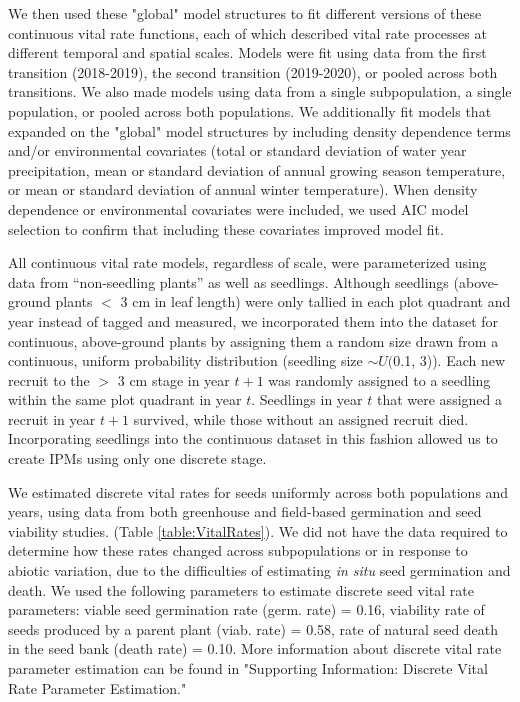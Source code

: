 \documentclass[12pt, letterpaper]{article}
\begin{document}
We then used these "global" model structures to fit different versions of these continuous vital rate functions, each of which described vital rate processes at different temporal and spatial scales. Models were fit using data from the first transition (2018-2019), the second transition (2019-2020), or pooled across both transitions. We also made models using data from a single subpopulation, a single population, or pooled across both populations. We additionally fit models that expanded on the "global" model structures by including density dependence terms and/or environmental covariates (total or standard deviation of water year precipitation, mean or standard deviation of annual growing season temperature, or mean or standard deviation of annual winter temperature). When density dependence or environmental covariates were included, we used AIC model selection to confirm that including these covariates improved model fit.   

All continuous vital rate models, regardless of scale, were parameterized using data from “non-seedling plants” as well as seedlings. Although seedlings (above-ground plants $<$ 3 cm in leaf length) were only tallied in each plot quadrant and year instead of tagged and measured, we incorporated them into the dataset for continuous, above-ground plants by assigning them a random size drawn from a continuous, uniform probability distribution (seedling size $\sim U($0.1, 3)). Each new recruit to the $>$ 3 cm stage in year $t+1$ was randomly assigned to a seedling within the same plot quadrant in year $t$. Seedlings in year $t$ that were assigned a recruit in year $t+1$ survived, while those without an assigned recruit died. Incorporating seedlings into the continuous dataset in this fashion allowed us to create IPMs using only one discrete stage.

We estimated discrete vital rates for seeds uniformly across both populations and years, using data from both greenhouse and field-based germination and seed viability studies. (Table \ref{table:VitalRates}). We did not have the data required to determine how these rates changed across subpopulations or in response to abiotic variation, due to the difficulties of estimating \textit{in situ} seed germination and death. We used the following parameters to estimate discrete seed vital rate parameters: viable seed germination rate (germ. rate) = 0.16, viability rate of seeds produced by a parent plant (viab. rate) = 0.58, rate of natural seed death in the seed bank (death rate) = 0.10. More information about discrete vital rate parameter estimation can be found in "Supporting Information: Discrete Vital Rate Parameter Estimation." 
\end{document}
